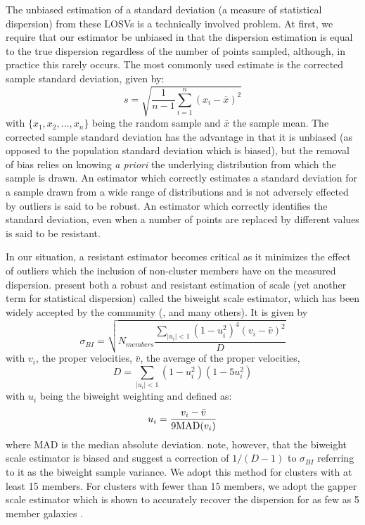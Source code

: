 \documentclass[apj, revtex4]{emulateapj}
\begin{document}
The unbiased estimation of a standard deviation (a measure of statistical dispersion) from these LOSVs is a technically involved problem. At first, we require that our estimator be unbiased in that the dispersion estimation is equal to the true dispersion regardless of the number of points sampled, although, in practice this rarely occurs. The most commonly used estimate is the corrected sample standard deviation, given by:
\begin{equation}
	s = \sqrt{\frac{1}{n-1} \sum_{i=1}^n (x_i - \bar{x})^2}
\end{equation}
with $\{x_1, x_2, ..., x_n\}$ being the random sample and $\bar{x}$ the sample mean. The corrected sample standard deviation has the advantage in that it is unbiased (as opposed to the population standard deviation which is biased), but the removal of bias relies on knowing \textit{a priori} the underlying distribution from which the sample is drawn. An estimator which correctly estimates a standard deviation for a sample drawn from a wide range of distributions and is not adversely effected by outliers is said to be robust. An estimator which correctly identifies the standard deviation, even when a number of points are replaced by different values is said to be resistant.

In our situation, a resistant estimator becomes critical as it minimizes the effect of outliers which the inclusion of non-cluster members have on the measured dispersion. \cite{Beers1990} present both a robust and resistant estimation of scale (yet another term for statistical dispersion) called the biweight scale estimator, which has been widely accepted by the community (\eg, \citealt{Milvang-Jensen2008, Owers2011, Murphy2011} and many others). It is given by 
\begin{equation}
	\sigma_{BI} = \sqrt{ N_{members} \frac{ \sum_{|u_i|<1} (1-u_i^2)^4 (v_i - \bar{v})^2} {D} }
\end{equation}
with $v_i$, the proper velocities, $\bar{v}$, the average of the proper velocities,
\begin{equation}
	D = \sum_{|u_i|<1} (1-u_i^2)(1-5u_i^2)
\end{equation}
with $u_i$ being the biweight weighting and defined as:
\begin{equation}
	u_i = \frac{v_i - \bar{v}}{9 {\rm MAD}(v_i)}
\end{equation}
where MAD is the median absolute deviation. \cite{Ruel2014} note, however, that the biweight scale estimator is biased and suggest a correction of $1/(D-1)$ to $\sigma_{BI}$ referring to it as the biweight sample variance. We adopt this method for clusters with at least 15 members. For clusters with fewer than 15 members, we adopt the gapper scale estimator \citep{Beers1990} which is shown to accurately recover the dispersion for as few as 5 member galaxies \citep{Hou2009}.
\end{document}
